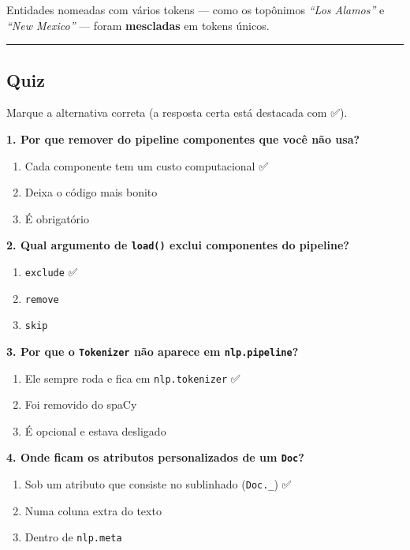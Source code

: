 \documentclass[
  brazilian,
  11pt,
]{article}
\providecommand{\tightlist}{%
  \setlength{\itemsep}{0pt}\setlength{\parskip}{0pt}}
\let\oldtexttt\texttt
\renewcommand{\texttt}[1]{{\color{inlink}\oldtexttt{#1}}}
\begin{document}
Entidades nomeadas com vários tokens --- como os topônimos \emph{``Los
Alamos''} e \emph{``New Mexico''} --- foram \textbf{mescladas} em tokens
únicos.

\begin{center}\rule{0.5\linewidth}{0.5pt}\end{center}

\subsection{Quiz}\label{quiz}

Marque a alternativa correta (a resposta certa está destacada com ✅).

\textbf{1. Por que remover do pipeline componentes que você não usa?}

\begin{enumerate}
\def\labelenumi{\arabic{enumi}.}
\tightlist
\item
  Cada componente tem um custo computacional ✅
\item
  Deixa o código mais bonito
\item
  É obrigatório
\end{enumerate}

\textbf{2. Qual argumento de \texttt{load()} exclui componentes do
pipeline?}

\begin{enumerate}
\def\labelenumi{\arabic{enumi}.}
\tightlist
\item
  \texttt{exclude} ✅
\item
  \texttt{remove}
\item
  \texttt{skip}
\end{enumerate}

\textbf{3. Por que o \texttt{Tokenizer} não aparece em
\texttt{nlp.pipeline}?}

\begin{enumerate}
\def\labelenumi{\arabic{enumi}.}
\tightlist
\item
  Ele sempre roda e fica em \texttt{nlp.tokenizer} ✅
\item
  Foi removido do spaCy
\item
  É opcional e estava desligado
\end{enumerate}

\textbf{4. Onde ficam os atributos personalizados de um \texttt{Doc}?}

\begin{enumerate}
\def\labelenumi{\arabic{enumi}.}
\tightlist
\item
  Sob um atributo que consiste no sublinhado (\texttt{Doc.\_}) ✅
\item
  Numa coluna extra do texto
\item
  Dentro de \texttt{nlp.meta}
\end{enumerate}
\end{document}
